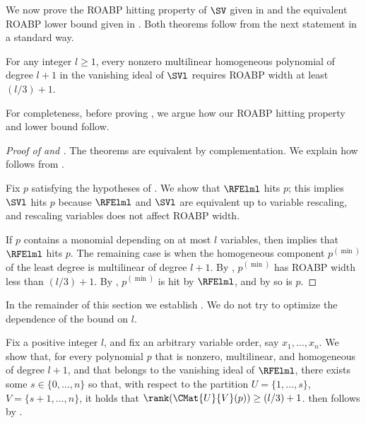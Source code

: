 \documentclass{toc}
\begin{document}
We now prove the ROABP hitting property of $\SV$ given in  and the equivalent ROABP lower bound given in . Both theorems follow from the next statement in a standard way. 
\begin{theorem}
  \label{thm.application.roabp.hardpart}
  For any integer $l \ge 1$,
  every nonzero multilinear homogeneous polynomial of degree $l+1$ in the vanishing ideal of $\SVl$ requires ROABP width at least $(l/3)+1$.
\end{theorem} 
For completeness, before proving , we argue how our ROABP hitting property and lower bound follow.
\begin{proof}[Proof of  and ]
  The theorems are equivalent by complementation. We explain how  follows from .

  \def\pdn{p^{(\min)}}
  Fix \(p\) satisfying the hypotheses of .
  We show that \(\RFElml\) hits \(p\);
  this implies \(\SVl\) hits \(p\) because \(\RFElml\) and \(\SVl\) are
  equivalent up to variable rescaling, and rescaling variables does not affect
  ROABP width.

  If $p$ contains a monomial depending on at most $l$ variables, then  implies that $\RFElml$ hits $p$. The remaining case is when the homogeneous component $\pdn$ of the least degree is multilinear of degree $l+1$. By , $\pdn$ has ROABP width less than $(l/3)+1$. By , $\pdn$ is hit by $\RFElml$, and by  so is $p$.
\end{proof}

In the remainder of this section we establish
. We do not try to optimize the dependence of the bound on $l$.

Fix a positive integer \(l\),
and fix an arbitrary variable order, say \(x_1,\ldots,x_n\).
We show that, for every polynomial \(p\) that is nonzero, multilinear, and homogeneous of
degree \(l+1\),
and that belongs to the vanishing ideal of \(\RFElml\),
there exists some \(s\in\{0,\ldots,n\}\)
so that,
with respect to the partition
\(U=\{1,\ldots,s\}\), \(V = \{{s+1},\ldots,n\}\),
it holds that \(\rank(\CMat{U}{V}(p)) \ge (l/3)+1\).
 then follows by
.
\end{document}

